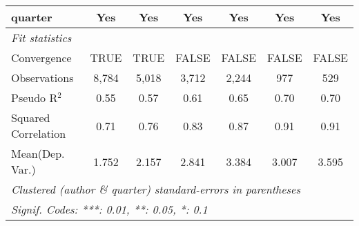 \begin{tabular}{lcccccc}
   quarter                                                    & Yes           & Yes           & Yes          & Yes          & Yes           & Yes\\  
   \midrule
   \emph{Fit statistics}\\
   Convergence                                                &TRUE           & TRUE          & FALSE        & FALSE        & FALSE         & FALSE\\  
   Observations                                               & 8,784         & 5,018         & 3,712        & 2,244        & 977           & 529\\  
   Pseudo R$^2$                                               & 0.55          & 0.57          & 0.61         & 0.65         & 0.70          & 0.70\\  
   Squared Correlation                                        & 0.71          & 0.76          & 0.83         & 0.87         & 0.91          & 0.91\\  
Mean(Dep. Var.) & 1.752 & 2.157 & 2.841 & 3.384 & 3.007 & 3.595 \\
   \midrule \midrule
   \multicolumn{7}{l}{\emph{Clustered (author \& quarter) standard-errors in parentheses}}\\
   \multicolumn{7}{l}{\emph{Signif. Codes: ***: 0.01, **: 0.05, *: 0.1}}\\
\end{tabular}
\par\endgroup
